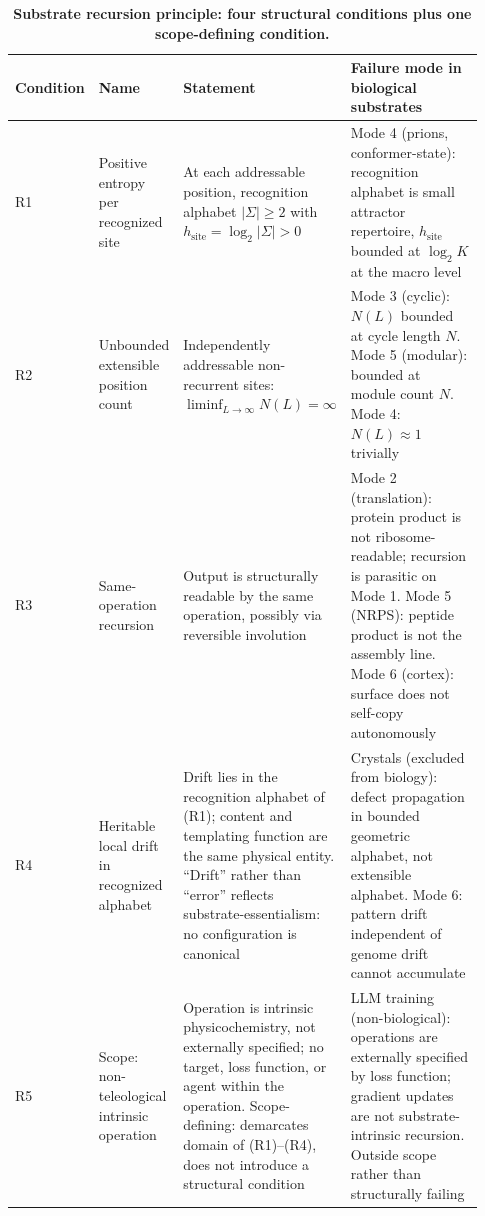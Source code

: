 \documentclass[aps,prx,reprint,amsmath,amssymb,floatfix,superscriptaddress,nofootinbib]{revtex4-2}
\theoremstyle{plain-thm}
\theoremstyle{definition-thm}
\begin{document}
\begin{table}
\caption{\textbf{Substrate recursion principle: four structural conditions plus one scope-defining condition.}}
\label{tab:principle}
\begin{tabular}{p{0.05\linewidth} p{0.18\linewidth} p{0.30\linewidth} p{0.40\linewidth}}
\toprule
Condition & Name & Statement & Failure mode in biological substrates \\
\midrule
R1 & Positive entropy per recognized site & At each addressable position, recognition alphabet $|\Sigma| \ge 2$ with $h_{\mathrm{site}} = \log_2 |\Sigma| > 0$ & Mode 4 (prions, conformer-state): recognition alphabet is small attractor repertoire, $h_{\mathrm{site}}$ bounded at $\log_2 K$ at the macro level \\
R2 & Unbounded extensible position count & Independently addressable non-recurrent sites: $\liminf_{L\to\infty} N(L) = \infty$ & Mode 3 (cyclic): $N(L)$ bounded at cycle length $N$. Mode 5 (modular): bounded at module count $N$. Mode 4: $N(L) \approx 1$ trivially \\
R3 & Same-operation recursion & Output is structurally readable by the same operation, possibly via reversible involution & Mode 2 (translation): protein product is not ribosome-readable; recursion is parasitic on Mode 1. Mode 5 (NRPS): peptide product is not the assembly line. Mode 6 (cortex): surface does not self-copy autonomously \\
R4 & Heritable local drift in recognized alphabet & Drift lies in the recognition alphabet of (R1); content and templating function are the same physical entity. ``Drift'' rather than ``error'' reflects substrate-essentialism: no configuration is canonical & Crystals (excluded from biology): defect propagation in bounded geometric alphabet, not extensible alphabet. Mode 6: pattern drift independent of genome drift cannot accumulate \\
R5 & Scope: non-teleological intrinsic operation & Operation is intrinsic physicochemistry, not externally specified; no target, loss function, or agent within the operation. Scope-defining: demarcates domain of (R1)--(R4), does not introduce a structural condition & LLM training (non-biological): operations are externally specified by loss function; gradient updates are not substrate-intrinsic recursion. Outside scope rather than structurally failing \\
\bottomrule
\end{tabular}
\end{table}
\end{document}
